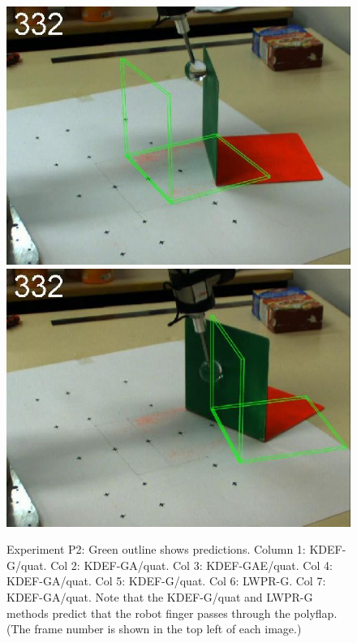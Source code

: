 \begin{figure}[tb]
{\includegraphics[width=\imgBXwid]{images/B2_LWPR1_58_5}
\includegraphics[width=\imgBXwid]{images/B2_2exp_38_5}
}
\caption
{Experiment P2: Green outline shows predictions. Column 1: KDEF-G/quat. Col 2:
KDEF-GA/quat. Col 3: KDEF-GAE/quat. Col 4: KDEF-GA/quat. Col 5:
KDEF-G/quat. Col 6: LWPR-G. Col 7: KDEF-GA/quat.
Note that the KDEF-G/quat and LWPR-G methods predict
that the robot finger passes through the polyflap.
(The frame number is shown in the top left of each image.)
}
\label{fig:ExperimentA}
\end{figure}


